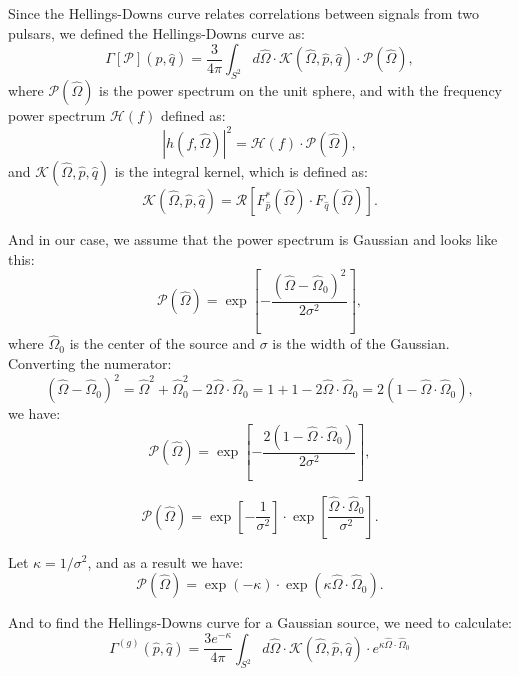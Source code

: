 Since the Hellings-Downs curve relates correlations between signals from two pulsars, we defined the Hellings-Downs curve as:
\begin{equation}
\Gamma[\mathcal{P}](\hat{p}, \hat{q}) = \frac{3}{4\pi}\int_{S^2} d \hat{\Omega} \cdot \mathcal{K}(\hat{\Omega}, \hat{p}, \hat{q}) \cdot \mathcal{P}(\hat{\Omega}),
\end{equation}
where $\mathcal{P}(\hat{\Omega})$ is the power spectrum on the unit sphere, and with the frequency power spectrum $\mathcal{H}(f)$ defined as:
\begin{equation}
|h(f, \hat{\Omega})|^2  = \mathcal{H}(f) \cdot \mathcal{P}(\hat{\Omega}),
\end{equation}
and $\mathcal{K}(\hat{\Omega},\hat{p}, \hat{q})$ is the integral kernel, which is defined as:
\begin{equation}
\mathcal{K}(\hat{\Omega},\hat{p}, \hat{q}) = \mathcal{R}\left[F^{*}_{\hat{p}}(\hat{\Omega}) \cdot F_{\hat{q}}(\hat{\Omega})\right].
\end{equation}

And in our case, we assume that the power spectrum is Gaussian and looks like this:
\begin{equation}
\mathcal{P}(\hat{\Omega}) = \exp \left[ - \frac{(\hat{\Omega} - \hat{\Omega}_0)^2}{2 \sigma^2} \right],
\end{equation}
where $\hat{\Omega}_0$ is the center of the source and $\sigma$ is the width of the Gaussian. Converting the numerator:
$$
(\hat{\Omega} - \hat{\Omega}_0)^2 = \hat{\Omega}^2 + \hat{\Omega}_0^2 - 2 \hat{\Omega} \cdot \hat{\Omega}_0 = 1 + 1 -  2 \hat{\Omega} \cdot \hat{\Omega}_0 = 2 (1 - \hat{\Omega} \cdot \hat{\Omega}_0),
$$
we have:
$$
\mathcal{P}(\hat{\Omega}) = \exp \left[ - \frac{2 (1 - \hat{\Omega} \cdot \hat{\Omega}_0)}{2 \sigma^2} \right],
$$

$$
\mathcal{P}(\hat{\Omega}) = \exp \left[ - \frac{1}{\sigma^2} \right] \cdot  \exp \left[ \frac{\hat{\Omega} \cdot \hat{\Omega}_0 }{\sigma^2}\right].
$$

Let $\kappa = 1/\sigma^2$, and as a result we have:
\begin{equation}
\mathcal{P}(\hat{\Omega}) = \exp \left(-\kappa \right) \cdot  \exp \left( \kappa \hat{\Omega} \cdot \hat{\Omega}_0 \right).
\end{equation}

And to find the Hellings-Downs curve for a Gaussian source, we need to calculate:
\begin{equation}
\Gamma^{(g)}(\hat{p}, \hat{q}) = \frac{3 e^{-\kappa}}{4\pi}\int_{S^2} d \hat{\Omega} \cdot \mathcal{K}(\hat{\Omega}, \hat{p}, \hat{q}) \cdot e^{\kappa \hat{\Omega} \cdot \hat{\Omega}_0}
\end{equation}